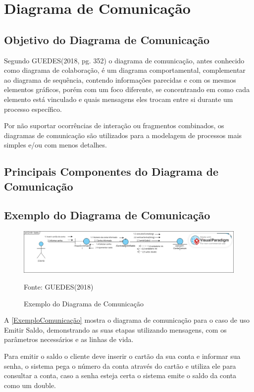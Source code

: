 \documentclass[12pt,openright,oneside,a4paper,
	chapter=TITLE,
	section=TITLE,
	english,brazil]{abntex2}
\begin{document}
\chapter{Diagrama de Comunicação}

\section{Objetivo do Diagrama de Comunicação}
Segundo GUEDES(2018, pg. 352) o diagrama de comunicação, antes conhecido como diagrama de colaboração, é um diagrama comportamental, complementar ao diagrama de sequência, contendo informações parecidas e com os mesmos elementos gráficos, porém com um foco diferente, se concentrando em como cada elemento está vinculado e quais mensagens eles trocam entre si durante um processo específico.

Por não suportar ocorrências de interação ou fragmentos combinados, os diagramas de comunicação são utilizados para a modelagem de processos mais simples e/ou com menos detalhes.

\section{Principais Componentes do Diagrama de Comunicação}

\section{Exemplo do Diagrama de Comunicação}

\begin{figure}[!htp]
	\caption{Exemplo do Diagrama de Comunicação}
	\centering
	\includegraphics[scale=0.3]{img/Exemplo Diagrama de Comunicação.png}
	\\

	\label{ExemploComunicação}
	\footnotesize\raggedright Fonte: GUEDES(2018)
\end{figure}

A \autoref{ExemploComunicação} mostra o diagrama de comunicação para o caso de uso Emitir Saldo, demonstrando as suas etapas utilizando mensagens, com os parâmetros necessários e as linhas de vida.

Para emitir o saldo o cliente deve inserir o cartão da sua conta e informar sua senha, o sistema pega o número da conta através do cartão e utiliza ele para consultar a conta, caso a senha esteja certa o sistema emite o saldo da conta como um double.
\end{document}
